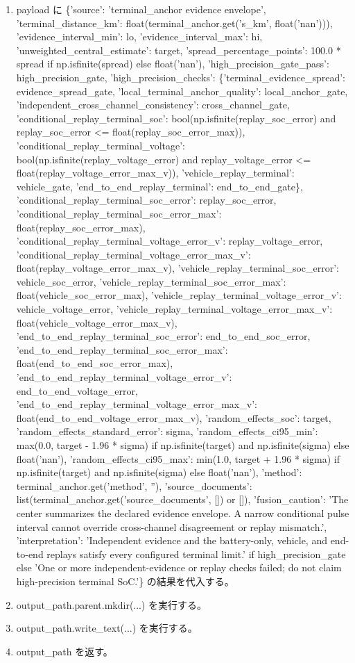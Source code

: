 \documentclass[a4paper,11pt]{article}
\begin{document}
\begin{enumerate}[leftmargin=1.8em]
\item payload に \{'source': 'terminal\_anchor evidence envelope', 'terminal\_distance\_km': float(terminal\_anchor.get('s\_km', float('nan'))), 'evidence\_interval\_min': lo, 'evidence\_interval\_max': hi, 'unweighted\_central\_estimate': target, 'spread\_percentage\_points': 100.0 * spread if np.isfinite(spread) else float('nan'), 'high\_precision\_gate\_pass': high\_precision\_gate, 'high\_precision\_checks': \{'terminal\_evidence\_spread': evidence\_spread\_gate, 'local\_terminal\_anchor\_quality': local\_anchor\_gate, 'independent\_cross\_channel\_consistency': cross\_channel\_gate, 'conditional\_replay\_terminal\_soc': bool(np.isfinite(replay\_soc\_error) and replay\_soc\_error <= float(replay\_soc\_error\_max)), 'conditional\_replay\_terminal\_voltage': bool(np.isfinite(replay\_voltage\_error) and replay\_voltage\_error <= float(replay\_voltage\_error\_max\_v)), 'vehicle\_replay\_terminal': vehicle\_gate, 'end\_to\_end\_replay\_terminal': end\_to\_end\_gate\}, 'conditional\_replay\_terminal\_soc\_error': replay\_soc\_error, 'conditional\_replay\_terminal\_soc\_error\_max': float(replay\_soc\_error\_max), 'conditional\_replay\_terminal\_voltage\_error\_v': replay\_voltage\_error, 'conditional\_replay\_terminal\_voltage\_error\_max\_v': float(replay\_voltage\_error\_max\_v), 'vehicle\_replay\_terminal\_soc\_error': vehicle\_soc\_error, 'vehicle\_replay\_terminal\_soc\_error\_max': float(vehicle\_soc\_error\_max), 'vehicle\_replay\_terminal\_voltage\_error\_v': vehicle\_voltage\_error, 'vehicle\_replay\_terminal\_voltage\_error\_max\_v': float(vehicle\_voltage\_error\_max\_v), 'end\_to\_end\_replay\_terminal\_soc\_error': end\_to\_end\_soc\_error, 'end\_to\_end\_replay\_terminal\_soc\_error\_max': float(end\_to\_end\_soc\_error\_max), 'end\_to\_end\_replay\_terminal\_voltage\_error\_v': end\_to\_end\_voltage\_error, 'end\_to\_end\_replay\_terminal\_voltage\_error\_max\_v': float(end\_to\_end\_voltage\_error\_max\_v), 'random\_effects\_soc': target, 'random\_effects\_standard\_error': sigma, 'random\_effects\_ci95\_min': max(0.0, target - 1.96 * sigma) if np.isfinite(target) and np.isfinite(sigma) else float('nan'), 'random\_effects\_ci95\_max': min(1.0, target + 1.96 * sigma) if np.isfinite(target) and np.isfinite(sigma) else float('nan'), 'method': terminal\_anchor.get('method', ''), 'source\_documents': list(terminal\_anchor.get('source\_documents', []) or []), 'fusion\_caution': 'The center summarizes the declared evidence envelope. A narrow conditional pulse interval cannot override cross-channel disagreement or replay mismatch.', 'interpretation': 'Independent evidence and the battery-only, vehicle, and end-to-end replays satisfy every configured terminal limit.' if high\_precision\_gate else 'One or more independent-evidence or replay checks failed; do not claim high-precision terminal SoC.'\} の結果を代入する。
\item output\_path.parent.mkdir(...) を実行する。
\item output\_path.write\_text(...) を実行する。
\item output\_path を返す。
            \end{enumerate}
\end{document}
